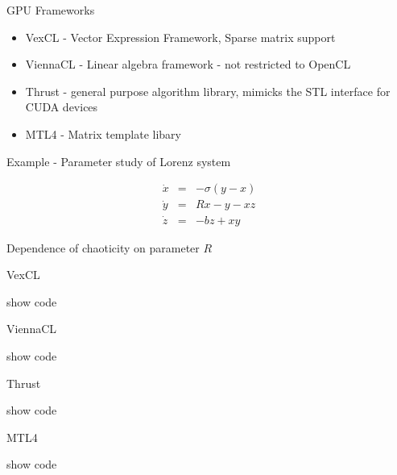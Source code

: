 \documentclass{beamer}
\newcommand{\heading}[1]{\centerline{\Large #1} \vspace{0.5em}}
\begin{document}
\begin{frame}[fragile]
 \heading{GPU Frameworks}

\begin{itemize}
 \item VexCL - Vector Expression Framework, Sparse matrix support
 \item ViennaCL - Linear algebra framework - not restricted to OpenCL
 \item Thrust - general purpose algorithm library, mimicks the STL interface for CUDA devices
 \item MTL4 - Matrix template libary
\end{itemize}

\end{frame}



\begin{frame}[fragile]
 \heading{Example - Parameter study of Lorenz system}

\begin{eqnarray*}
\dot{x} & = & - \sigma ( y - x ) \\
\dot{y} & = & R x - y - x z \\
\dot{z} & = & - b z + x y
\end{eqnarray*}

Dependence of chaoticity on parameter $R$

\end{frame}


\begin{frame}[fragile]
 \heading{VexCL}

show code

\end{frame}



\begin{frame}[fragile]
 \heading{ViennaCL}

show code

\end{frame}




\begin{frame}[fragile]
 \heading{Thrust}

 show code
\end{frame}


\begin{frame}[fragile]
 \heading{MTL4}

 show code

\end{frame}
\end{document}

